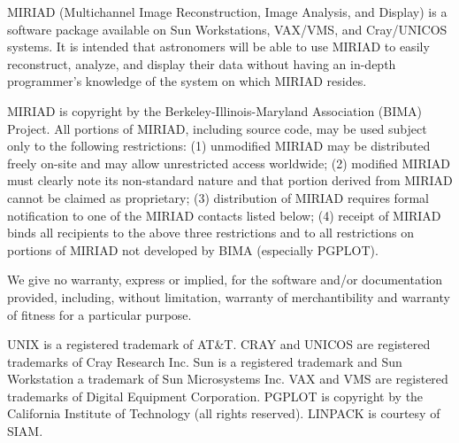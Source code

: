 \phantom{MIRIAD}
\rm
\vfill
{\eightpoint

MIRIAD (Multichannel Image Reconstruction, Image Analysis, and
Display) is a software package available on Sun Workstations, VAX/VMS,
and Cray/UNICOS systems.  It is intended that astronomers will be able to
use MIRIAD to easily reconstruct, analyze, and display their data
without having an in-depth programmer's knowledge of the system on
which MIRIAD resides.

MIRIAD is copyright by the Berkeley-Illinois-Maryland Association (BIMA)
Project.  All portions of MIRIAD, including source code, may be used
subject only to the following restrictions:  (1) unmodified MIRIAD may
be distributed freely on-site and may allow unrestricted access worldwide;
(2) modified MIRIAD must clearly note its non-standard nature and that
portion derived from MIRIAD cannot be claimed as proprietary;
(3) distribution of MIRIAD requires formal notification to one of the
MIRIAD contacts listed below; (4) receipt of MIRIAD binds all recipients
to the above three restrictions and to all restrictions on portions of
MIRIAD not developed by BIMA (especially PGPLOT).

We give no warranty, express or implied, for the software and/or
documentation provided, including, without limitation, warranty
of merchantibility and warranty of fitness for a particular purpose.

UNIX is a registered trademark of AT\&T.
CRAY and UNICOS are registered trademarks of Cray Research Inc.
Sun is a registered trademark and Sun Workstation a trademark of Sun
Microsystems Inc.
VAX and VMS are registered trademarks of Digital Equipment Corporation.
PGPLOT is copyright by the California Institute of Technology (all
rights reserved).
LINPACK is courtesy of SIAM.

}
